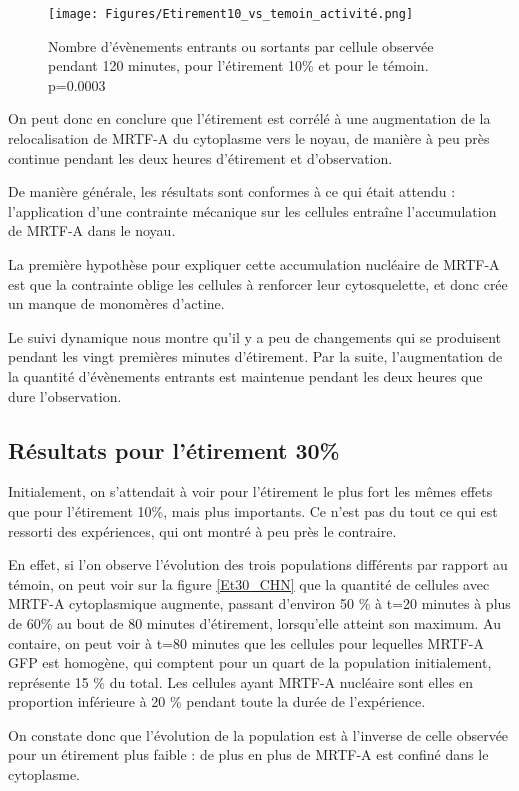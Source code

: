 \documentclass{report}
\begin{document}
\begin{figure}
\texttt{[image: Figures/Etirement10\_vs\_temoin\_activité.png]} 
\caption{\label{activité_Et10} Nombre d'évènements entrants ou sortants par cellule observée pendant 120 minutes, pour l'étirement 10\% et pour le témoin. p=0.0003 }
\end{figure}

On peut donc en conclure que l'étirement est corrélé à une augmentation de la relocalisation de MRTF-A du cytoplasme vers le noyau, de manière à peu près continue pendant les deux heures d'étirement et d'observation. 

De manière générale, les résultats sont conformes à ce qui était attendu : l'application d'une contrainte mécanique sur les cellules entraîne l'accumulation de MRTF-A dans le noyau. 

La première hypothèse pour expliquer cette accumulation nucléaire de MRTF-A est que la contrainte oblige les cellules à renforcer leur cytosquelette, et donc crée un manque de monomères d'actine.  

Le suivi dynamique nous montre qu'il y a peu de changements qui se produisent pendant les vingt premières minutes d'étirement. Par la suite, l'augmentation de la quantité d'évènements entrants est maintenue pendant les deux heures que dure l'observation. 


\subsection{Résultats pour l'étirement 30\%}

Initialement, on s'attendait à voir pour l'étirement le plus fort les mêmes effets que pour l'étirement 10\%, mais plus importants. 
Ce n'est pas du tout ce qui est ressorti des expériences, qui ont montré à peu près le contraire. 

En effet, si l'on observe l'évolution des trois populations différents par rapport au témoin, on peut voir sur la figure \ref{Et30_CHN} que la quantité de cellules avec MRTF-A cytoplasmique augmente, passant d'environ 50 \% à t=20 minutes à plus de 60\% au bout de 80 minutes d'étirement, lorsqu'elle atteint son maximum. 
Au contaire, on peut voir à t=80 minutes que les cellules pour lequelles MRTF-A GFP est homogène, qui comptent pour un quart de la population initialement, représente 15 \% du total. 
Les cellules ayant MRTF-A nucléaire sont elles en proportion inférieure à 20 \% pendant toute la durée de l'expérience. 

On constate donc que l'évolution de la population est à l'inverse de celle observée pour un étirement plus faible : de plus en plus de MRTF-A est confiné dans le cytoplasme. 
\end{document}
